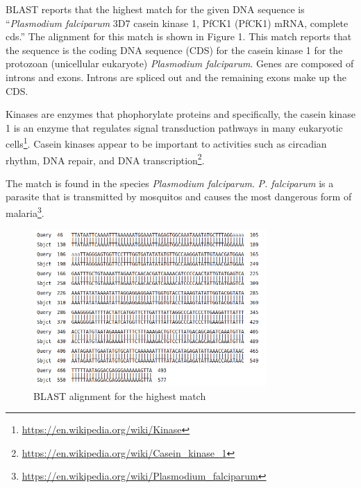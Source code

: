 \documentclass{acm_proc_article-sp}
\begin{document}
BLAST reports that the highest match for the given DNA sequence is ``\textit{Plasmodium falciparum} 3D7 casein kinase 1, PfCK1 (PfCK1) mRNA, complete cds.''  The alignment for this match is shown in Figure 1.  This match reports that the sequence is the coding DNA sequence (CDS) for the casein kinase 1 for the protozoan (unicellular eukaryote) \textit{Plasmodium falciparum}.  Genes are composed of introns and exons.  Introns are spliced out and the remaining exons make up the CDS.  

Kinases are enzymes that phophorylate proteins and specifically, the casein kinase 1 is an enzyme that regulates signal transduction pathways in many eukaryotic cells\footnote{\url{https://en.wikipedia.org/wiki/Kinase}}.  Casein kinases appear to be important to activities such as circadian rhythm, DNA repair, and DNA transcription\footnote{\url{https://en.wikipedia.org/wiki/Casein_kinase_1}}.  

The match is found in the species \textit{Plasmodium falciparum}.  \textit{P. falciparum} is a parasite that is transmitted by mosquitos and causes the most dangerous form of malaria\footnote{\url{https://en.wikipedia.org/wiki/Plasmodium_falciparum}}.  

\begin{figure}[!b]
	\includegraphics[trim={0 0 2cm 0}, clip,width=3.5in]{alignment-cropped.png}
	\caption{BLAST alignment for the highest match}
	\label{fig:hist}
\end{figure}

  
%


%
%

\balancecolumns
\end{document}
